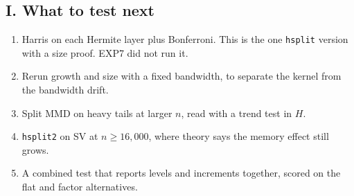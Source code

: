 \documentclass[11pt,a4paper]{article}
\newcommand{\kn}[1]{\texttt{#1}}
\begin{document}
\subsection*{I. What to test next}
\begin{enumerate}
\item Harris on each Hermite layer plus Bonferroni. This is the one \kn{hsplit} version with a size proof. EXP7 did not run it.
\item Rerun growth and size with a fixed bandwidth, to separate the kernel from the bandwidth drift.
\item Split MMD on heavy tails at larger $n$, read with a trend test in $H$.
\item \kn{hsplit2} on SV at $n \ge 16{,}000$, where theory says the memory effect still grows.
\item A combined test that reports levels and increments together, scored on the flat and factor alternatives.
\end{enumerate}
\end{document}
